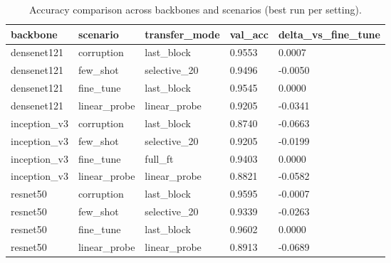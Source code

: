 \begin{table}[t]
\centering
\caption{Accuracy comparison across backbones and scenarios (best run per setting).}
\label{tab:accuracy\_comparison}
\begin{tabular}{lllll}
\toprule
backbone & scenario & transfer\_mode & val\_acc & delta\_vs\_fine\_tune \\
\midrule
densenet121 & corruption & last\_block & 0.9553 & 0.0007 \\
densenet121 & few\_shot & selective\_20 & 0.9496 & -0.0050 \\
densenet121 & fine\_tune & last\_block & 0.9545 & 0.0000 \\
densenet121 & linear\_probe & linear\_probe & 0.9205 & -0.0341 \\
inception\_v3 & corruption & last\_block & 0.8740 & -0.0663 \\
inception\_v3 & few\_shot & selective\_20 & 0.9205 & -0.0199 \\
inception\_v3 & fine\_tune & full\_ft & 0.9403 & 0.0000 \\
inception\_v3 & linear\_probe & linear\_probe & 0.8821 & -0.0582 \\
resnet50 & corruption & last\_block & 0.9595 & -0.0007 \\
resnet50 & few\_shot & selective\_20 & 0.9339 & -0.0263 \\
resnet50 & fine\_tune & last\_block & 0.9602 & 0.0000 \\
resnet50 & linear\_probe & linear\_probe & 0.8913 & -0.0689 \\
\bottomrule
\end{tabular}
\end{table}
